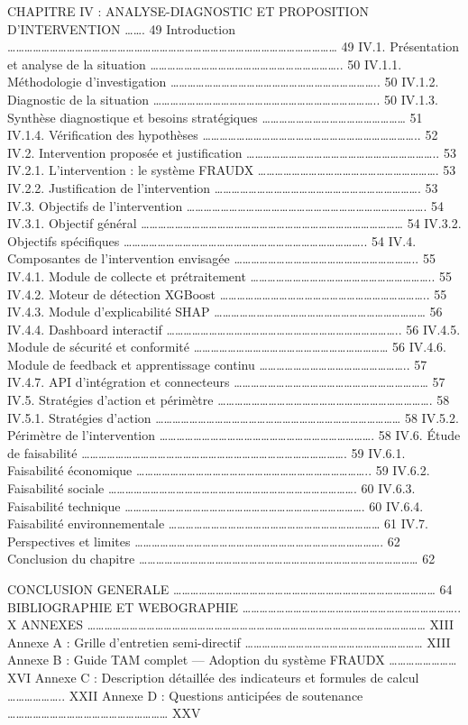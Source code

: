 \documentclass[
  12pt,
]{article}
\begin{document}
CHAPITRE IV : ANALYSE-DIAGNOSTIC ET PROPOSITION D’INTERVENTION ……. 49
Introduction ……………………………………………………………………………………………………… 49 IV.1.
Présentation et analyse de la situation ………………………………………………………….. 50
IV.1.1. Méthodologie d’investigation ……………………………………………………………….. 50
IV.1.2. Diagnostic de la situation …………………………………………………………………….. 50
IV.1.3. Synthèse diagnostique et besoins stratégiques ……………………………………………
51 IV.1.4. Vérification des hypothèses ………………………………………………………………….. 52
IV.2. Intervention proposée et justification ………………………………………………………….. 53
IV.2.1. L’intervention : le système FRAUDX ………………………………………………………. 53
IV.2.2. Justification de l’intervention ………………………………………………………………. 53
IV.3. Objectifs de l’intervention …………………………………………………………………………. 54
IV.3.1. Objectif général ………………………………………………………………………………… 54 IV.3.2.
Objectifs spécifiques ………………………………………………………………………….. 54 IV.4.
Composantes de l’intervention envisagée ……………………………………………………….. 55
IV.4.1. Module de collecte et prétraitement ……………………………………………………….. 55
IV.4.2. Moteur de détection XGBoost ……………………………………………………………….. 55
IV.4.3. Module d’explicabilité SHAP ………………………………………………………………… 56 IV.4.4.
Dashboard interactif ……………………………………………………………………….. 56 IV.4.5. Module de
sécurité et conformité …………………………………………………………… 56 IV.4.6. Module de
feedback et apprentissage continu …………………………………………….. 57 IV.4.7. API
d’intégration et connecteurs …………………………………………………………… 57 IV.5. Stratégies
d’action et périmètre …………………………………………………………………. 58 IV.5.1. Stratégies
d’action …………………………………………………………………………… 58 IV.5.2. Périmètre de
l’intervention …………………………………………………………………. 58 IV.6. Étude de faisabilité
…………………………………………………………………………………. 59 IV.6.1. Faisabilité économique
……………………………………………………………………….. 59 IV.6.2. Faisabilité sociale
……………………………………………………………………………. 60 IV.6.3. Faisabilité technique
…………………………………………………………………………. 60 IV.6.4. Faisabilité environnementale
………………………………………………………………… 61 IV.7. Perspectives et limites
……………………………………………………………………………. 62 Conclusion du chapitre
……………………………………………………………………………………… 62

CONCLUSION GENERALE ………………………………………………………………………………… 64 BIBLIOGRAPHIE ET
WEBOGRAPHIE ………………………………………………………………….. X ANNEXES
………………………………………………………………………………………………………… XIII Annexe A : Grille
d’entretien semi-directif ……………………………………………………… XIII Annexe B : Guide
TAM complet — Adoption du système FRAUDX …………………… XVI Annexe C :
Description détaillée des indicateurs et formules de calcul ………………..
XXII Annexe D : Questions anticipées de soutenance …………………………………………………
XXV
\end{document}
